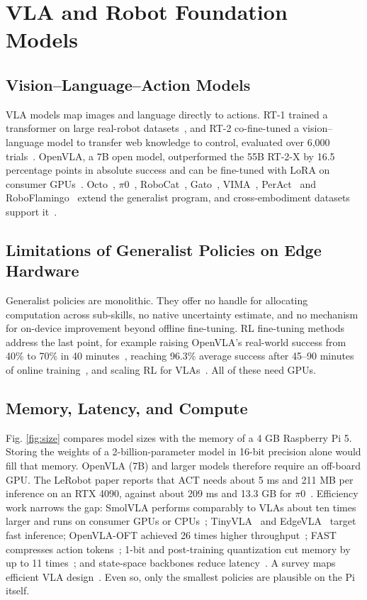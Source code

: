\documentclass[journal]{IEEEtran}
\begin{document}
\section{VLA and Robot Foundation Models}\label{sec:vla}

\subsection{Vision--Language--Action Models}\label{sec:vlamodels}
VLA models map images and language directly to actions. RT-1 trained a transformer on large real-robot datasets~\cite{Brohan2023a}, and RT-2 co-fine-tuned a vision--language model to transfer web knowledge to control, evaluated over 6,000 trials~\cite{Brohan2023b}. OpenVLA, a 7B open model, outperformed the 55B RT-2-X by 16.5 percentage points in absolute success and can be fine-tuned with LoRA on consumer GPUs~\cite{Kim2024}. Octo~\cite{Octo2024}, \ensuremath{\pi}0~\cite{Black2024}, RoboCat~\cite{Bousmalis2023}, Gato~\cite{Reed2022}, VIMA~\cite{Jiang2023}, PerAct~\cite{Shridhar2022} and RoboFlamingo~\cite{Li2024a} extend the generalist program, and cross-embodiment datasets support it~\cite{OXE2024}.


\subsection{Limitations of Generalist Policies on Edge Hardware}\label{sec:generalist}
Generalist policies are monolithic. They offer no handle for allocating computation across sub-skills, no native uncertainty estimate, and no mechanism for on-device improvement beyond offline fine-tuning. RL fine-tuning methods address the last point, for example raising OpenVLA's real-world success from 40\% to 70\% in 40 minutes~\cite{Mark2025}, reaching 96.3\% average success after 45--90 minutes of online training~\cite{Chen2025}, and scaling RL for VLAs~\cite{Lu2025,Li2026}. All of these need GPUs.


\subsection{Memory, Latency, and Compute}\label{sec:memory}
Fig. \ref{fig:size} compares model sizes with the memory of a 4 GB Raspberry Pi 5. Storing the weights of a 2-billion-parameter model in 16-bit precision alone would fill that memory. OpenVLA (7B) and larger models therefore require an off-board GPU. The LeRobot paper reports that ACT needs about 5 ms and 211 MB per inference on an RTX 4090, against about 209 ms and 13.3 GB for \ensuremath{\pi}0~\cite{Cadene2026}. Efficiency work narrows the gap: SmolVLA performs comparably to VLAs about ten times larger and runs on consumer GPUs or CPUs~\cite{Shukor2025}; TinyVLA~\cite{Wen2025} and EdgeVLA~\cite{Budzianowski2025} target fast inference; OpenVLA-OFT achieved 26 times higher throughput~\cite{Kim2025}; FAST compresses action tokens~\cite{Pertsch2025}; 1-bit and post-training quantization cut memory by up to 11 times~\cite{Wang2025a,Zhang2026a}; and state-space backbones reduce latency~\cite{Liu2024a}. A survey maps efficient VLA design~\cite{Yu2025}. Even so, only the smallest policies are plausible on the Pi itself.
\end{document}
